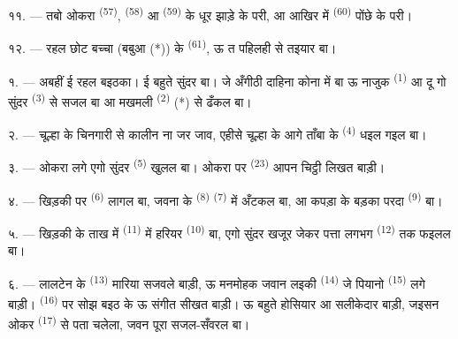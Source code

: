 

११. --- तबो ओकरा  \textsuperscript{(57)},
 \textsuperscript{(58)} आ 
\textsuperscript{(59)} के धूर झाड़े के परी, आ आखिर में 
\textsuperscript{(60)} पोंछे के परी।

१२. --- रहल छोट बच्चा (बबुआ (*)) के  \textsuperscript{(61)},
ऊ त पहिलही से तइयार बा।

\VUsaut{5.0mm}
\VUsaut{3.0mm}

१. --- अबहीं ई रहल बइठका। ई बहुते सुंदर  बा। जे अँगीठी दाहिना
कोना में बा ऊ नाजुक  \textsuperscript{(1)} आ दू गो सुंदर
 \textsuperscript{(3)} से सजल बा आ मखमली 
\textsuperscript{(2)} (*) से ढँकल बा।

२. --- चूल्हा के चिनगारी से कालीन ना जर जाव, एहीसे चूल्हा के आगे ताँबा
के  \textsuperscript{(4)} धइल गइल बा।

३. --- ओकरा लगे एगो सुंदर  \textsuperscript{(5)} खुलल
बा। ओकरा पर  \textsuperscript{(23)} आपन चिट्ठी लिखत
बाड़ी।

४. --- खिड़की पर  \textsuperscript{(6)} लागल बा,
जवना के  \textsuperscript{(8)} 
\textsuperscript{(7)} में अँटकल बा, आ कपड़ा के बड़का परदा
 \textsuperscript{(9)} बा।

५. --- खिड़की के ताख में  \textsuperscript{(11)} में
हरियर  \textsuperscript{(10)} बा, एगो सुंदर खजूर जेकर पत्ता
लगभग  \textsuperscript{(12)} तक फइलल बा।

६. --- लालटेन के  \textsuperscript{(13)} मारिया सजवले
बाड़ी, ऊ मनमोहक जवान लइकी \textsuperscript{(14)} जे पियानो
\textsuperscript{(15)} लगे बाड़ी।  \textsuperscript{(16)} पर
सोझ बइठ के ऊ संगीत सीखत बाड़ी। ऊ बहुते होसियार आ सलीकेदार बाड़ी, जइसन
ओकर  \textsuperscript{(17)} से पता चलेला, जवन पूरा
सजल-सँवरल बा।

